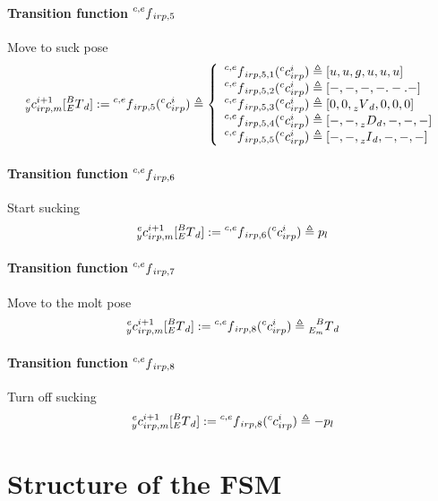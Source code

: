 \documentclass[12pt]{article}
\begin{document}
		\paragraph{Transition function $\prescript{c,e}{}f_{irp, 5}$}
		Move to suck pose
			\[ \prescript{e}{y}c_{irp, m}^{i + 1} \lbrack \prescript{B}{E}T_d \rbrack := \prescript{c, e}{}f_{irp, 5}(\prescript{c}{}c_{irp}^i) \triangleq \left\{
    \begin{array}{l}
	\prescript{c, e}{}f_{irp, 5, 1} (\prescript{c}{}c_{irp}^i) \triangleq  [u, u, g, u, u, u]\\
	\prescript{c, e}{}f_{irp, 5, 2} (\prescript{c}{}c_{irp}^i) \triangleq  [-, -, -, -. -. -] \\
	\prescript{c, e}{}f_{irp, 5, 3} (\prescript{c}{}c_{irp}^i) \triangleq  [0, 0, \prescript{}{z}V_d, 0, 0, 0]\\
	\prescript{c, e}{}f_{irp, 5, 4} (\prescript{c}{}c_{irp}^i) \triangleq  [-, -, \prescript{}{z}D_d, -, -, -]\\
	\prescript{c, e}{}f_{irp, 5, 5} (\prescript{c}{}c_{irp}^i) \triangleq  [-, -, \prescript{}{z}I_d, -, -, -]\
    \end{array}
\right. \]
		
		\paragraph{Transition function $\prescript{c,e}{}f_{irp, 6}$}
		Start sucking
			\[ \prescript{e}{y}c_{irp, m}^{i + 1} \lbrack \prescript{B}{E}T_d \rbrack := \prescript{c, e}{}f_{irp, 6}(\prescript{c}{}c_{irp}^i) \triangleq p_l \]
		
		\paragraph{Transition function $\prescript{c,e}{}f_{irp, 7}$}
		Move to the molt pose
						\[ \prescript{e}{y}c_{irp, m}^{i + 1} \lbrack \prescript{B}{E}T_d \rbrack := \prescript{c, e}{}f_{irp, 8}(\prescript{c}{}c_{irp}^i) \triangleq \prescript{B}{E_m}T_d \]
		
		\paragraph{Transition function $\prescript{c,e}{}f_{irp, 8}$}
		Turn off sucking
			\[ \prescript{e}{y}c_{irp, m}^{i + 1} \lbrack \prescript{B}{E}T_d \rbrack := \prescript{c, e}{}f_{irp, 8}(\prescript{c}{}c_{irp}^i) \triangleq -p_l \]
		
			
\section{Structure of the FSM}

\end{document}
